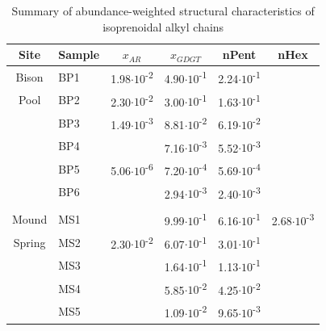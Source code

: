 


\singlespace
\begin{table}
\centering
\begin{adjustbox}{width=\textwidth,keepaspectratio}
\begin{threeparttable}
  \caption{Summary of abundance-weighted structural characteristics of isoprenoidal alkyl chains}




\begin{tabular}{clllcc}
\toprule
Site  & Sample & \multicolumn{1}{c}{$x_{AR}$} & \multicolumn{1}{c}{$x_{GDGT}$} & nPent & nHex \\
\midrule
Bison & BP1   & 1.98$\cdot 10$\textsuperscript{-2} & 4.90$\cdot 10$\textsuperscript{-1} & 2.24$\cdot 10$\textsuperscript{-1} &  \\
Pool  & BP2   & 2.30$\cdot 10$\textsuperscript{-2} & 3.00$\cdot 10$\textsuperscript{-1} & 1.63$\cdot 10$\textsuperscript{-1} &  \\
      & BP3   & 1.49$\cdot 10$\textsuperscript{-3} & 8.81$\cdot 10$\textsuperscript{-2} & 6.19$\cdot 10$\textsuperscript{-2} &  \\
      & BP4   &       & 7.16$\cdot 10$\textsuperscript{-3} & 5.52$\cdot 10$\textsuperscript{-3} &  \\
      & BP5   & 5.06$\cdot 10$\textsuperscript{-6} & 7.20$\cdot 10$\textsuperscript{-4} & 5.69$\cdot 10$\textsuperscript{-4} &  \\
      & BP6   &       & 2.94$\cdot 10$\textsuperscript{-3} & 2.40$\cdot 10$\textsuperscript{-3} &  \\
      &       &       &       &       &  \\
Mound & MS1   &       & 9.99$\cdot 10$\textsuperscript{-1} & 6.16$\cdot 10$\textsuperscript{-1} & 2.68$\cdot 10$\textsuperscript{-3} \\
Spring & MS2   & 2.30$\cdot 10$\textsuperscript{-2} & 6.07$\cdot 10$\textsuperscript{-1} & 3.01$\cdot 10$\textsuperscript{-1} &  \\
      & MS3   &       & 1.64$\cdot 10$\textsuperscript{-1} & 1.13$\cdot 10$\textsuperscript{-1} &  \\
      & MS4   &       & 5.85$\cdot 10$\textsuperscript{-2} & 4.25$\cdot 10$\textsuperscript{-2} &  \\
      & MS5   &       & 1.09$\cdot 10$\textsuperscript{-2} & 9.65$\cdot 10$\textsuperscript{-3} &  \\

\end{tabular}
\end{threeparttable}
\end{adjustbox}
\end{table}
